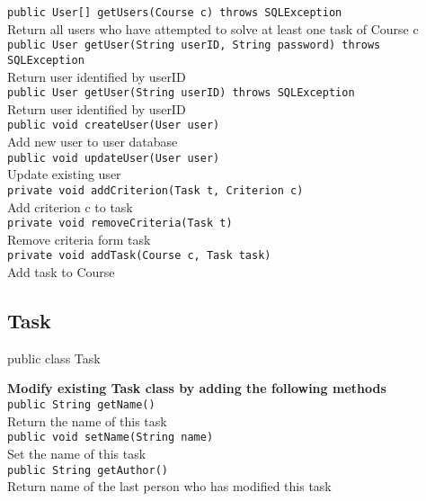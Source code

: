 {\tt 		public User[] getUsers(Course c) throws SQLException} \\
Return all users who have attempted to solve at least one task of Course c\\
	
{\tt 		public User getUser(String userID, String password) throws SQLException} \\
Return user identified by userID\\

{\tt 		public User getUser(String userID) throws SQLException} \\
Return user identified by userID\\

{\tt 		public void createUser(User user)} \\
Add new user to user database\\
	
{\tt 		public void updateUser(User user)} \\
Update existing user\\
	
{\tt 		private void addCriterion(Task t, Criterion c)} \\
Add criterion c to task\\
	
{\tt 		private void removeCriteria(Task t)} \\
Remove criteria form task\\
	
{\tt 		private void addTask(Course c, Task task)} \\
Add task to Course\\





\subsection{Task}
public class Task

{\bf Modify existing Task class by adding the following methods}\\

{\tt 		public String getName()} \\
Return the name of this task\\
	
{\tt 		public void setName(String name)} \\
Set the name of this task\\
	
{\tt 		public String getAuthor()} \\
Return name of the last person who has modified this task\\


